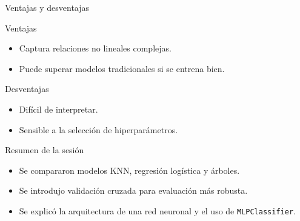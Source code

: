 \documentclass{beamer}
\begin{document}
\begin{frame}{Ventajas y desventajas}
  \begin{block}{Ventajas}
    \begin{itemize}
      \item Captura relaciones no lineales complejas.
      \item Puede superar modelos tradicionales si se entrena bien.
    \end{itemize}
  \end{block}
  \begin{block}{Desventajas}
    \begin{itemize}
      \item Difícil de interpretar.
      \item Sensible a la selección de hiperparámetros.
    \end{itemize}
  \end{block}
\end{frame}

\begin{frame}{Resumen de la sesión}
  \begin{itemize}
    \item Se compararon modelos KNN, regresión logística y árboles.
    \item Se introdujo validación cruzada para evaluación más robusta.
    \item Se explicó la arquitectura de una red neuronal y el uso de \texttt{MLPClassifier}.
  \end{itemize}
\end{frame}
\end{document}
